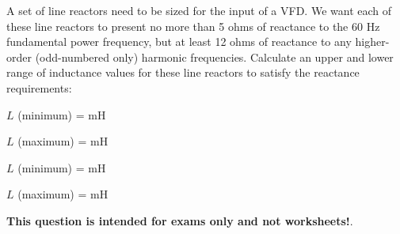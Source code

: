 

A set of line reactors need to be sized for the input of a VFD.  We want each of these line reactors to present no more than 5 ohms of reactance to the 60 Hz fundamental power frequency, but at least 12 ohms of reactance to any higher-order (odd-numbered only) harmonic frequencies.  Calculate an upper and lower range of inductance values for these line reactors to satisfy the reactance requirements:

\vskip 30pt

$L$ (minimum) = \underbar{\hskip 50pt} mH

\vskip 30pt

$L$ (maximum) = \underbar{\hskip 50pt} mH







$L$ (minimum) =  mH

$L$ (maximum) =  mH







{\bf This question is intended for exams only and not worksheets!}.


